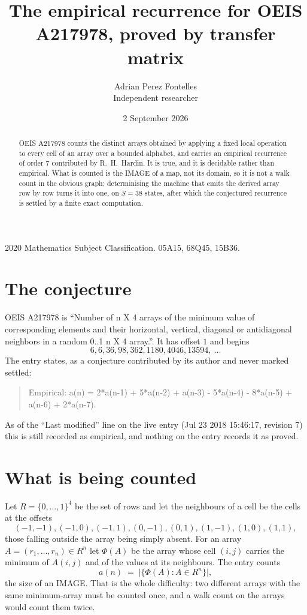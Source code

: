 \documentclass[11pt,a4paper]{article}
\title{The empirical recurrence for OEIS A217978, proved by transfer matrix}
\author{Adrian Perez Fontelles\\ \small Independent researcher}
\date{2 September 2026}
\theoremstyle{plain}
\theoremstyle{definition}
\begin{document}
\maketitle

\begin{abstract}
OEIS A217978 counts the distinct arrays obtained by applying a fixed local operation to every cell
of an array over a bounded alphabet, and carries an empirical recurrence of order $7$
contributed by R.~H.~Hardin. It is true, and it is decidable rather than empirical. What is
counted is the IMAGE of a map, not its domain, so it is not a walk count in the obvious graph;
determinising the machine that emits the derived array row by row turns it into one, on
$S=38$ states, after which the conjectured recurrence is settled by a finite exact
computation.
\end{abstract}

\noindent\small 2020 Mathematics Subject Classification. 05A15, 68Q45, 15B36.\normalsize

\section{The conjecture}

OEIS A217978 is ``Number of n X 4 arrays of the minimum value of corresponding elements and their horizontal, vertical, diagonal or antidiagonal neighbors in a random 0..1 n X 4 array.''. It has offset $1$ and begins
\[
6, 6, 36, 98, 362, 1180, 4046, 13594,\ \dots
\]
The entry states, as a conjecture contributed by its author and never marked settled:
\begin{quote}
Empirical: a(n) = 2*a(n-1) + 5*a(n-2) + a(n-3) - 5*a(n-4) - 8*a(n-5) + a(n-6) + 2*a(n-7).
\end{quote}
As of the ``Last modified'' line on the live entry (Jul 23 2018 15:46:17, revision 7) this is still
recorded as empirical, and nothing on the entry records it as proved.

\section{What is being counted}

Let $R=\{0,\dots,1\}^{4}$ be the set of rows and let the neighbours of
a cell be the cells at the offsets
\[
(-1,-1), (-1,0), (-1,1), (0,-1), (0,1), (1,-1), (1,0), (1,1),
\]
those falling outside the array being simply absent. For an array
$A=(r_1,\dots,r_n)\in R^n$ let $\Phi(A)$ be the array whose cell $(i,j)$ carries the
minimum of $A(i,j)$ and of the values at its neighbours. The entry counts
\[
a(n)\;=\;\bigl|\{\Phi(A):A\in R^n\}\bigr| ,
\]
the size of an IMAGE. That is the whole difficulty: two different arrays with the same
minimum-array must be counted once, and a walk count on the arrays would count them twice.
\end{document}
